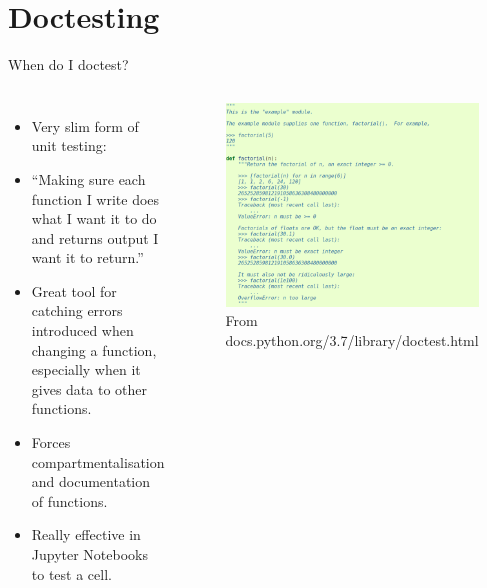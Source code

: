 \documentclass[aspectratio=1610, 11pt]{beamer} %
\begin{document}
\section{Doctesting}
\begin{frame}{When do I doctest?}
\begin{columns}
\begin{itemize}
\item Very slim form of unit testing: 
\item ``Making sure each function I write does what I want it to do and returns output I want it to return.'' 
\item Great tool for catching errors introduced when changing a function, especially when it gives data to other functions.
\item Forces compartmentalisation and documentation of functions.
\item Really effective in Jupyter Notebooks to test a cell.

\end{itemize}

\begin{figure}
    \includegraphics[height=.7\textheight]{figures/screenshotDoctest.png}
    \caption{From docs.python.org/3.7/library/doctest.html}
    \label{fig:documentation}
\end{figure}

\end{columns}
\end{frame}
\end{document}
